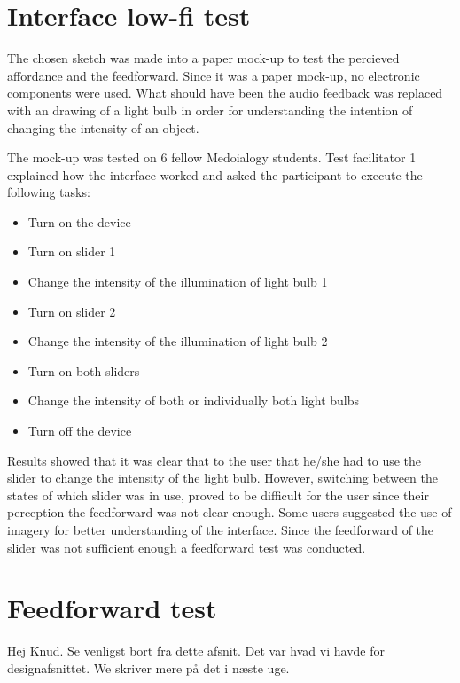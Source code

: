 \section{Interface low-fi test}
The chosen sketch was made into a paper mock-up to test the percieved affordance and the feedforward. Since it was a paper mock-up, no electronic components were used. What should have been the audio feedback was replaced with an drawing of a light bulb in order for understanding the intention of changing the intensity of an object. 

The mock-up was tested on 6 fellow Medoialogy students. Test facilitator 1 explained how the interface worked and asked the participant to execute the following tasks:

\begin{itemize}
\item Turn on the device
\item Turn on slider 1
\item Change the intensity of the illumination of light bulb 1
\item Turn on slider 2
\item Change the intensity of the illumination of light bulb 2
\item Turn on both sliders
\item Change the intensity of both or individually both light bulbs
\item Turn off the device
\end{itemize}

Results showed that it was clear that to the user that he/she had to use the slider to change the intensity of the light bulb. However, switching between the states of which slider was in use, proved to be difficult for the user since their perception the feedforward was not clear enough. Some users suggested the use of imagery for better understanding of the interface.
Since the feedforward of the slider was not sufficient enough a feedforward test was conducted.

\section{Feedforward test}
Hej Knud. Se venligst bort fra dette afsnit. Det var hvad vi havde for designafsnittet. We skriver mere på det i næste uge.





